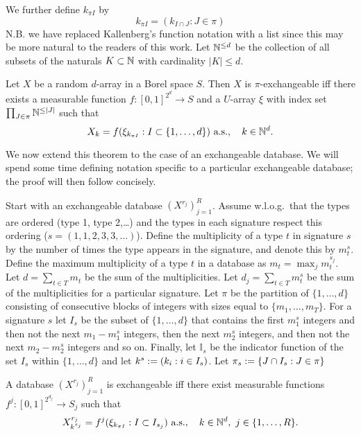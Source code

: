We further define $k_{\pi I}$ by
\begin{equation}
  k_{\pi I} = (k_{I \cap J} : J \in \pi)
\end{equation}
N.B. we have replaced Kallenberg's function notation with a list since this may be more natural to the readers of this work.
Let $\mathbb{N}^{\leq d}$ be the collection of all subsets of the naturals $K \subset \mathbb{N}$ with cardinality $|K| \leq d$.

\begin{prop}
\label{prop:piexas}
  Let $X$ be a random $d$-array in a Borel space $S$.
  Then $X$ is $\pi$-exchangeable iff there exists a measurable function $f:[0,1]^{2^d}\to S$ and a $U$-array $\xi$ with index set $\prod_{J\in\pi} \mathbb{N}^{\leq |J|}$ such that
  \begin{equation}
    X_k = f(\xi_{k_{\pi I}} : I \subset \{1,\ldots,d\}) \ \textrm{a.s.}, \quad k \in \mathbb{N}^d.
    \label{eq:piexas}
  \end{equation}
\end{prop}

We now extend this theorem to the case of an exchangeable database.
We will spend some time defining notation specific to a particular exchangeable database; the proof will then follow concisely.

Start with an exchangeable database $(X^{r_j})_{j=1}^R$.
Assume w.l.o.g.\ that the types are ordered (\eg type 1, type 2,\dots) and the types in each signature respect this ordering (\eg $s = (1,1,2,3,3,\dots)$).
Define the multiplicity of a type $t$ in signature $s$ by the number of times the type appears in the signature, and denote this by $m_{t}^s$.
Define the maximum multiplicity of a type $t$ in a database as $m_t = \max_j m_t^{s_j}$.
Let $d = \sum_{t\in T} m_t$ be the sum of the multiplicities.
Let $d_j = \sum_{t\in T} m_t^s$ be the sum of the multiplicities for a particular signature.
Let $\pi$ be the partition of $\{1,\ldots,d\}$ consisting of consecutive blocks of integers with sizes equal to $\{m_1,\ldots,m_T\}$.
For a signature $s$ let $I_s$ be the subset of $\{1,\ldots,d\}$ that contains the first $m_1^s$ integers and then not the next $m_1 - m_1^s$ integers, then the next $m_2^s$ integers, and then not the next $m_2 - m_2^s$ integers and so on.
Finally, let $\mathbb{I}_s$ be the indicator function of the set $I_s$ within $\{1,\ldots,d\}$ and let $k^s := (k_i : i \in I_s)$.
Let $\pi_s := \{J \cap I_s : J \in \pi\}$

\begin{thm}
  \label{thm:as-database}
  A database $(X^{r_j})_{j=1}^R$ is exchangeable iff there exist measurable functions $f^j : [0,1]^{2^{d_j}} \to S_j$ such that
  \begin{equation}
    X_{k^{s_j}}^{r_j} = f^j(\xi_{k_{\pi I}} : I \subset I_{s_j}) \ \textrm{a.s.}, \quad k \in \mathbb{N}^d, \ j \in \{1,\ldots,R\}.
  \end{equation}
\end{thm}

